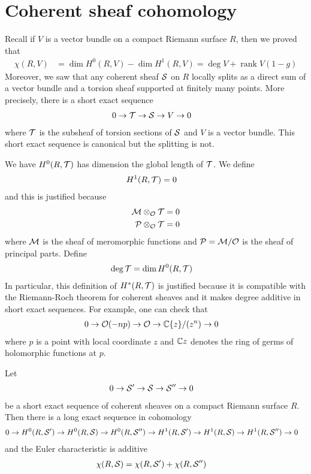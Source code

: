 \documentclass[12pt]{article}
\begin{document}
\section{Coherent sheaf cohomology}

Recall if $V$ is a vector bundle on a compact Riemann surface $R$, then we proved that \begin{align*}
    \chi(R,V) & = \dim H^0(R,V) - \dim H^1(R,V) = \deg V + \operatorname{rank} V (1-g)
\end{align*} Moreover, we saw that any coherent sheaf ${\mathcal{S}}$ on $R$ locally splits as a direct sum of a vector bundle and a torsion sheaf supported at finitely many points. More precisely, there is a short exact sequence \begin{align*}
    0 \to {\mathcal{T}} & \to {\mathcal{S}} \to V \to 0
\end{align*} where ${\mathcal{T}}$ is the subsheaf of torsion sections of ${\mathcal{S}}$ and $V$ is a vector bundle. This short exact sequence is canonical but the splitting is not. 

We have $H^0(R,{\mathcal{T}})$ has dimension the global length of ${\mathcal{T}}$. We define \begin{align*}
    H^1(R,{\mathcal{T}}) & = 0
\end{align*} and this is justified because \begin{align*}
    {\mathcal{M}} \otimes_{{\mathcal{O}}} {\mathcal{T}} & = 0 \\
    {\mathcal{P}} \otimes_{{\mathcal{O}}} {\mathcal{T}} & = 0
\end{align*} where ${\mathcal{M}}$ is the sheaf of meromorphic functions and ${\mathcal{P}} = {\mathcal{M}}/{\mathcal{O}}$ is the sheaf of principal parts. Define \begin{align*}
    \deg {\mathcal{T}} & = \dim H^0(R,{\mathcal{T}})
\end{align*} In particular, this definition of $H^*(R,{\mathcal{T}})$ is justified because it is compatible with the Riemann-Roch theorem for coherent sheaves and it makes degree additive in short exact sequences. For example, one can check that \begin{align*}
    0 \to {\mathcal{O}}(-np) \to {\mathcal{O}} & \to \mathbb{C}\{z\}/(z^n) \to 0
\end{align*} where $p$ is a point with local coordinate $z$ and $\mathbb{C}{z}$ denotes the ring of germs of holomorphic functions at $p$. 

\begin{theorem}
    Let \begin{align*}
        0 \to {\mathcal{S}}' & \to {\mathcal{S}} \to {\mathcal{S}}'' \to 0
    \end{align*} be a short exact sequence of coherent sheaves on a compact Riemann surface $R$. Then there is a long exact sequence in cohomology \begin{align*}
        0 \to H^0(R,{\mathcal{S}}') & \to H^0(R,{\mathcal{S}}) \to H^0(R,{\mathcal{S}}'') \to H^1(R,{\mathcal{S}}') \to H^1(R,{\mathcal{S}}) \to H^1(R,{\mathcal{S}}'') \to 0
    \end{align*} and the Euler characteristic is additive \begin{align*}
        \chi(R,{\mathcal{S}}) & = \chi(R,{\mathcal{S}}') + \chi(R,{\mathcal{S}}'')
    \end{align*}
\end{theorem}
\end{document}
